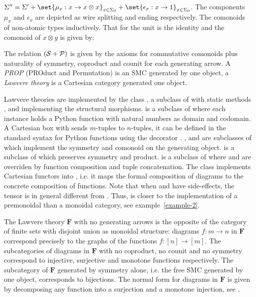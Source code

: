 $\Sigma'' = \Sigma' + \set{\mu_{x} : x \to x \otimes x}_{x \in \Sigma_0} + \set{\epsilon_x : x \to 1}_{x \in \Sigma_0}$.
The components $\mu_{x}$ and $\epsilon_{x}$ are depicted as wire splitting and
ending respectively. The comonoids of non-atomic
types inductively. That for the unit is the identity and the comonoid
of $x \otimes y$ is given by:
\begin{center}

\end{center}
The relation $(\cal{S} + \cal{P})$ is given by the axioms for commutative
comonoids plus naturality of symmetry, coproduct and counit for each generating
arrow.
A \emph{PROP} (PROduct and Permutation) \cite{Lack04} is an SMC generated by one object, a \emph{Lawvere theory} \cite{Lawvere63} is a Cartesian category generated one object.

Lawvere theories are implemented by the class , a subclass of \linebreak {} with static methods ,  and  implementing the structural morphisms.
 is a subclass of  where each instance holds a Python function with natural numbers as domain and codomain. A Cartesian box  with  sends $m$-tuples to $n$-tuples, it can be defined in the standard syntax for Python functions using the decorator .
,  and  are subclasses of  which implement the symmetry and comonoid on the generating object.
 is a subclass of  which preserves symmetry and product.
 is a subclass of  where  and  are overriden by function composition and tuple concatenation.
The  class implements Cartesian functors into , i.e. it maps the formal composition of diagrams to the concrete composition of functions.
Note that when  and  have side-effects, the tensor  is in
general different from . Thus, 
is closer to the implementation of a premonoidal than a monoidal category,
see example~\ref{example-2}.

\begin{example}
The Lawvere theory $\mathbf{F}$ with no generating arrows is the
opposite of the category of finite sets with disjoint union as monoidal structure: diagrams $f : m \to n$ in
$\mathbf{F}$ correspond precisely to the graphs of the functions $f : [n] \to [m]$.
The subcategories of diagrams in $\mathbf{F}$ with no coproduct, no counit and no symmetry correspond to injective, surjective and monotone functions respectively.
The subcategory of $\mathbf{F}$ generated by symmetry alone, i.e. the free SMC generated by one object, corresponds to bijections.
The normal form for diagrams in $\mathbf{F}$ is given by decomposing any function into a surjection and a monotone injection, see \cite[Theorem~3]{Lafont03}.
\end{example}

